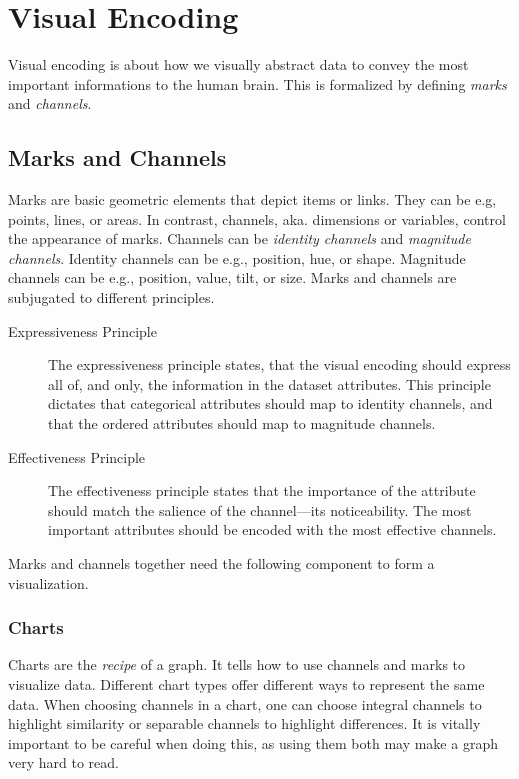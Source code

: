 \chapter{Visual Encoding}
Visual encoding is about how we visually abstract data to convey the most important informations to the human brain.
This is formalized by defining \emph{marks} and \emph{channels}.


\section{Marks and Channels}
Marks are basic geometric elements that depict items or links.
They can be e.g, points, lines, or areas.
In contrast, channels, aka. dimensions or variables, control the appearance of marks.
Channels can be \emph{identity channels} and \emph{magnitude channels}.
Identity channels can be e.g., position, hue, or shape.
Magnitude channels can be e.g., position, value, tilt, or size.
Marks and channels are subjugated to different principles.

\begin{description}
    \item[Expressiveness Principle] The expressiveness principle states, that the visual encoding should express all of, and only, the information in the dataset attributes.
        This principle dictates that categorical attributes should map to identity channels, and that the ordered attributes should map to magnitude channels.

    \item[Effectiveness Principle] The effectiveness principle states that the importance of the attribute should match the salience of the channel---its noticeability.
        The most important attributes should be encoded with the most effective channels.
\end{description}

\noindent
Marks and channels together need the following component to form a visualization.

\subsection{Charts}
Charts are the \emph{recipe} of a graph.
It tells how to use channels and marks to visualize data.
Different chart types offer different ways to represent the same data.
When choosing channels in a chart, one can choose integral channels to highlight similarity or separable channels to highlight differences.
It is vitally important to be careful when doing this, as using them both may make a graph very hard to read.
